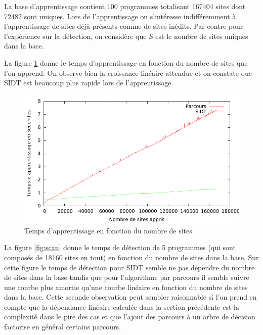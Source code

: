 La base d'apprentissage contient 100 programmes totalisant 167404 sites dont 72482 sont uniques. Lors de l'apprentissage on s'intéresse indifféremment à l'apprentissage de sites déjà présents comme de sites inédits. Par contre pour l'expérience sur la détection, on considère que $S$ est le nombre de sites uniques dans la base.

La figure \ref{fig:apprentissage} donne le temps d'apprentissage en fonction du nombre de sites que l'on apprend.
On observe bien la croissance linéaire attendue et on constate que SIDT est beaucoup plus rapide lors de l'apprentissage.

\begin{figure}[h]
\begin{center}
\includegraphics{supports/plots/plotLearn.pdf}
\end{center}
\caption{Temps d'apprentissage en fonction du nombre de sites}
\label{fig:apprentissage}
\end{figure}

La figure \ref{fig:scan} donne le temps de détection de 5 programmes (qui sont composés de 18160 sites en tout) en fonction du nombre de sites dans la base.
Sur cette figure le temps de détection pour SIDT semble ne pas dépendre du nombre de sites dans la base tandis que pour l'algorithme par parcours il semble suivre une courbe plus amortie qu'une courbe linéaire en fonction du nombre de sites dans la base.
Cette seconde observation peut sembler raisonnable si l'on prend en compte que la dépendance linéaire calculée dans la section précédente est la complexité dans le pire des cas et que l'ajout des parcours à un arbre de décision factorise en général certains parcours.

